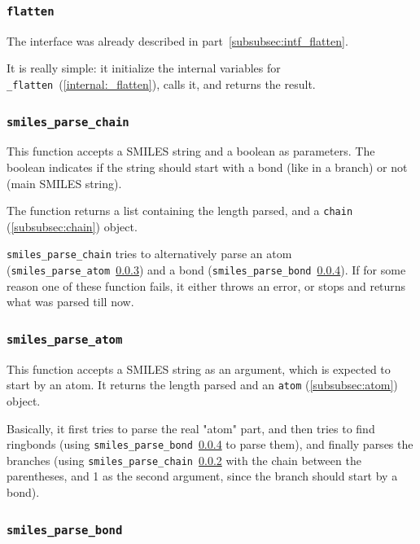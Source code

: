 \documentclass[a4paper, 11pt]{article}
\begin{document}
\subsubsection{\tt flatten}\label{internal:flatten}

The interface was already described in part~\ref{subsubsec:intf_flatten}.

It is really simple: it initialize the internal variables for {\tt \_flatten}~(\ref{internal:_flatten}), calls it, and returns the result.

\subsubsection{\tt smiles\_parse\_chain}\label{internal:smiles_parse_chain}

This function accepts a SMILES string and a boolean as parameters. The boolean indicates if the string should start with a bond (like in a branch) or not (main SMILES string).

The function returns a list containing the length parsed, and a \texttt{chain} (\ref{subsubsec:chain}) object.

{\tt smiles\_parse\_chain} tries to alternatively parse an atom ({\tt smiles\_parse\_atom}~\ref{internal:smiles_parse_atom}) and a bond ({\tt smiles\_parse\_bond}~\ref{internal:smiles_parse_bond}). If for some reason one of these function fails, it either throws an error, or stops and returns what was parsed till now.

\subsubsection{\tt smiles\_parse\_atom}\label{internal:smiles_parse_atom}

This function accepts a SMILES string as an argument, which is expected to start by an atom. It returns the length parsed and an \texttt{atom} (\ref{subsubsec:atom}) object.

Basically, it first tries to parse the real "atom" part, and then tries to find ringbonds (using {\tt smiles\_parse\_bond}~\ref{internal:smiles_parse_bond} to parse them), and finally parses the branches (using {\tt smiles\_parse\_chain}~\ref{internal:smiles_parse_chain} with the chain between the parentheses, and 1 as the second argument, since the branch should start by a bond).

\subsubsection{\tt smiles\_parse\_bond}\label{internal:smiles_parse_bond}
\end{document}
